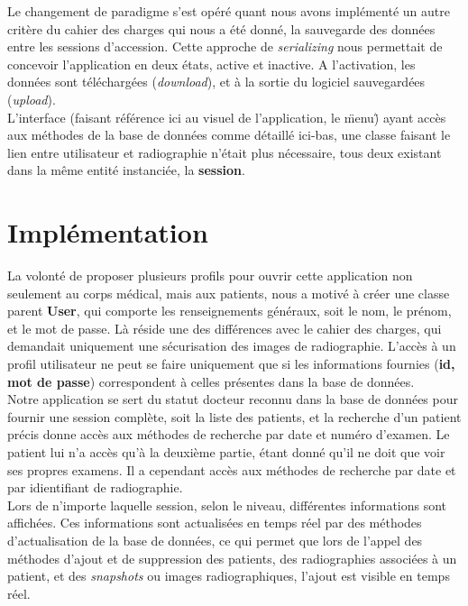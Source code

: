 \documentclass[12pt,a4paper]{article}
\begin{document}
\begin{multicols}{2}
		Le changement de paradigme s'est opéré quant nous avons implémenté un autre critère du cahier des charges qui nous a été donné, la sauvegarde des données entre les sessions d'accession. Cette approche de \textit{serializing} nous permettait de concevoir l'application en deux états, active et inactive. A l'activation, les données sont téléchargées (\textit{download}), et à la sortie du logiciel sauvegardées (\textit{upload}). \\
				
		L'interface (faisant référence ici au visuel de l'application, le \"menu\") ayant accès aux méthodes de la base de données comme détaillé ici-bas, une classe faisant le lien entre utilisateur et radiographie n'était plus nécessaire, tous deux existant dans la même entité instanciée, la \textbf{session}.
				
		\section{Implémentation}
				
		La volonté de proposer plusieurs profils pour ouvrir cette application non seulement au corps médical, mais aux patients, nous a motivé à créer une classe parent \textbf{User}, qui comporte les renseignements généraux, soit le nom, le prénom, et le mot de passe. Là réside une des différences avec le cahier des charges, qui demandait uniquement une sécurisation des images de radiographie. L'accès à un profil utilisateur ne peut se faire uniquement que si les informations fournies (\textbf{id, mot de passe}) correspondent à celles présentes dans la base de données. \\
				
		Notre application se sert du statut docteur reconnu dans la base de données pour fournir une session complète, soit la liste des patients, et la recherche d'un patient précis donne accès aux méthodes de recherche par date et numéro d'examen. Le patient lui n'a accès qu'à la deuxième partie, étant donné qu'il ne doit que voir ses propres examens. Il a cependant accès aux méthodes de recherche par date et par idientifiant de radiographie.\\
				
		Lors de n'importe laquelle session, selon le niveau, différentes informations sont affichées. Ces informations sont actualisées en temps réel par des méthodes d'actualisation de la base de données, ce qui permet que lors de l'appel des méthodes d'ajout et de suppression des patients, des radiographies associées à un patient, et des \textit{snapshots} ou images radiographiques, l'ajout est visible en temps réel.\\
				

\end{multicols}
\end{document}
